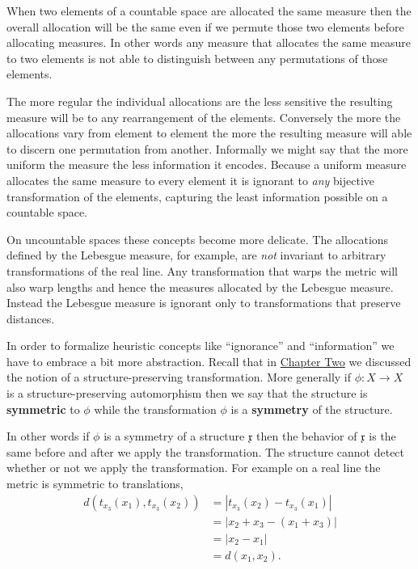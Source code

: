\documentclass[
  letterpaper,
  DIV=11,
  numbers=noendperiod]{scrartcl}
\begin{document}
When two elements of a countable space are allocated the same measure
then the overall allocation will be the same even if we permute those
two elements before allocating measures. In other words any measure that
allocates the same measure to two elements is not able to distinguish
between any permutations of those elements.

The more regular the individual allocations are the less sensitive the
resulting measure will be to any rearrangement of the elements.
Conversely the more the allocations vary from element to element the
more the resulting measure will able to discern one permutation from
another. Informally we might say that the more uniform the measure the
less information it encodes. Because a uniform measure allocates the
same measure to every element it is ignorant to \emph{any} bijective
transformation of the elements, capturing the least information possible
on a countable space.

On uncountable spaces these concepts become more delicate. The
allocations defined by the Lebesgue measure, for example, are \emph{not}
invariant to arbitrary transformations of the real line. Any
transformation that warps the metric will also warp lengths and hence
the measures allocated by the Lebesgue measure. Instead the Lebesgue
measure is ignorant only to transformations that preserve distances.

In order to formalize heuristic concepts like ``ignorance'' and
``information'' we have to embrace a bit more abstraction. Recall that
in
\href{https://betanalpha.github.io/assets/chapters_html/spaces.html}{Chapter
Two} we discussed the notion of a structure-preserving transformation.
More generally if \(\phi : X \rightarrow X\) is a structure-preserving
automorphism then we say that the structure is \textbf{symmetric} to
\(\phi\) while the transformation \(\phi\) is a \textbf{symmetry} of the
structure.

In other words if \(\phi\) is a symmetry of a structure \(\mathfrak{x}\)
then the behavior of \(\mathfrak{x}\) is the same before and after we
apply the transformation. The structure cannot detect whether or not we
apply the transformation. For example on a real line the metric is
symmetric to translations, \begin{align*}
d( t_{x_{3}}(x_{1}), t_{x_{3}}(x_{2}) )
&=
| t_{x_{3}}(x_{2}) - t_{x_{3}}(x_{1}) |
\\
&=
| x_{2} + x_{3} - (x_{1} + x_{3}) |
\\
&=
| x_{2} - x_{1} |
\\
&=
d(x_{1}, x_{2}).
\end{align*}
\end{document}
